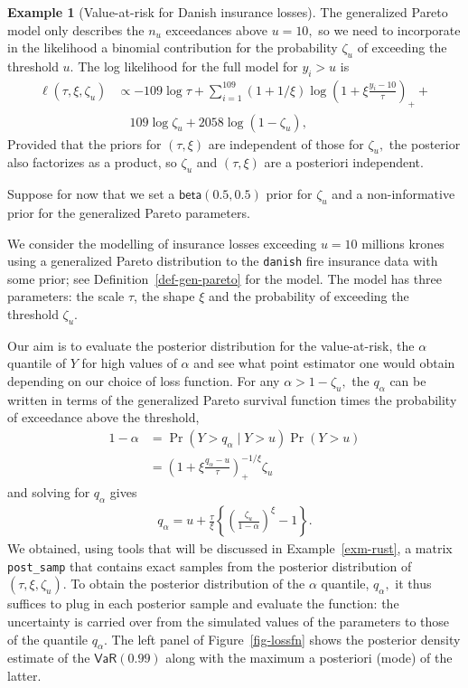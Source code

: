 \documentclass[
  11pt,
  letterpaper,
]{scrbook}
\theoremstyle{definition}
\newtheorem{example}{Example}[chapter]
\theoremstyle{plain}
\theoremstyle{plain}
\theoremstyle{plain}
\theoremstyle{definition}
\theoremstyle{definition}
\theoremstyle{plain}
\theoremstyle{plain}
\theoremstyle{remark}
\begin{document}
\begin{example}[Value-at-risk for Danish insurance
losses]
The generalized Pareto model only describes the \(n_u\) exceedances
above \(u=10,\) so we need to incorporate in the likelihood a binomial
contribution for the probability \(\zeta_u\) of exceeding the threshold
\(u.\) The log likelihood for the full model for \(y_i>u\) is
\begin{align*}
\ell(\tau, \xi, \zeta_u) &\propto -109 \log \tau + \sum_{i=1}^{109} (1+1/\xi)\log\left(1+\xi\frac{y_i-10}{\tau}\right)_{+} + \\& \quad   109\log \zeta_u + 2058 \log(1-\zeta_u), 
\end{align*} Provided that the priors for \((\tau, \xi)\) are
independent of those for \(\zeta_u,\) the posterior also factorizes as a
product, so \(\zeta_u\) and \((\tau, \xi)\) are a posteriori
independent.

Suppose for now that we set a \(\mathsf{beta}(0.5, 0.5)\) prior for
\(\zeta_u\) and a non-informative prior for the generalized Pareto
parameters.

We consider the modelling of insurance losses exceeding \(u=10\)
millions krones using a generalized Pareto distribution to the
\texttt{danish} fire insurance data with some prior; see
Definition~\ref{def-gen-pareto} for the model. The model has three
parameters: the scale \(\tau\), the shape \(\xi\) and the probability of
exceeding the threshold \(\zeta_u\).

Our aim is to evaluate the posterior distribution for the value-at-risk,
the \(\alpha\) quantile of \(Y\) for high values of \(\alpha\) and see
what point estimator one would obtain depending on our choice of loss
function. For any \(\alpha > 1-\zeta_u,\) the \(q_{\alpha}\) can be
written in terms of the generalized Pareto survival function times the
probability of exceedance above the threshold, \begin{align*}
1- \alpha  &= \Pr(Y > q_\alpha \mid Y > u) \Pr(Y > u) 
\\ &= \left(1+\xi \frac{q_{\alpha}-u}{\tau}\right)_{+}^{-1/\xi}\zeta_u
\end{align*} and solving for \(q_{\alpha}\) gives \begin{align*}
q_{\alpha} = u+ \frac{\tau}{\xi} \left\{\left(\frac{\zeta_u}{1-\alpha}\right)^\xi-1\right\}.
\end{align*} We obtained, using tools that will be discussed in
Example~\ref{exm-rust}, a matrix \texttt{post\_samp} that contains exact
samples from the posterior distribution of \((\tau, \xi, \zeta_u).\) To
obtain the posterior distribution of the \(\alpha\) quantile,
\(q_{\alpha},\) it thus suffices to plug in each posterior sample and
evaluate the function: the uncertainty is carried over from the
simulated values of the parameters to those of the quantile
\(q_{\alpha}.\) The left panel of Figure~\ref{fig-lossfn} shows the
posterior density estimate of the \(\mathsf{VaR}(0.99)\) along with the
maximum a posteriori (mode) of the latter.


\end{example}
\end{document}
